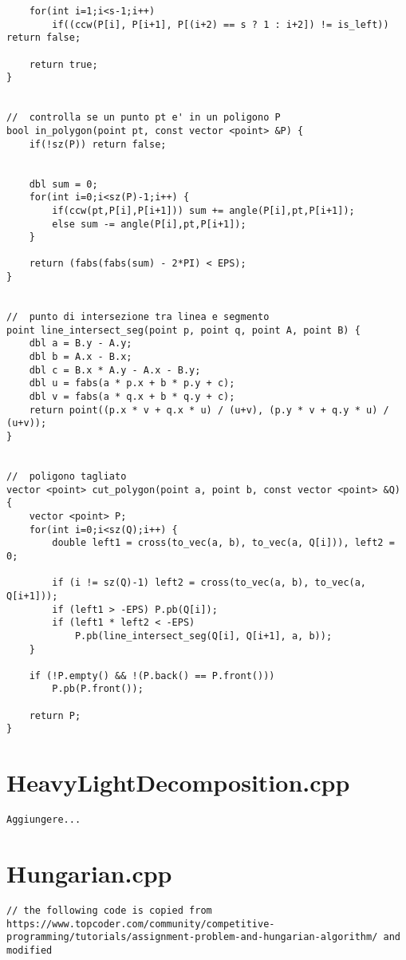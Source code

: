 \documentclass[a4paper,landscape,8pt]{extarticle}
\begin{document}
\begin{multicols}{3}
\begin{lstlisting}
    for(int i=1;i<s-1;i++)
        if((ccw(P[i], P[i+1], P[(i+2) == s ? 1 : i+2]) != is_left)) return false;

    return true;
}


//  controlla se un punto pt e' in un poligono P
bool in_polygon(point pt, const vector <point> &P) {
    if(!sz(P)) return false;


    dbl sum = 0;
    for(int i=0;i<sz(P)-1;i++) {
        if(ccw(pt,P[i],P[i+1])) sum += angle(P[i],pt,P[i+1]);
        else sum -= angle(P[i],pt,P[i+1]);
    }

    return (fabs(fabs(sum) - 2*PI) < EPS);
}


//  punto di intersezione tra linea e segmento
point line_intersect_seg(point p, point q, point A, point B) {
    dbl a = B.y - A.y;
    dbl b = A.x - B.x;
    dbl c = B.x * A.y - A.x - B.y;
    dbl u = fabs(a * p.x + b * p.y + c);
    dbl v = fabs(a * q.x + b * q.y + c);
    return point((p.x * v + q.x * u) / (u+v), (p.y * v + q.y * u) / (u+v));
}


//  poligono tagliato
vector <point> cut_polygon(point a, point b, const vector <point> &Q) {
    vector <point> P;
    for(int i=0;i<sz(Q);i++) {
        double left1 = cross(to_vec(a, b), to_vec(a, Q[i])), left2 = 0;

        if (i != sz(Q)-1) left2 = cross(to_vec(a, b), to_vec(a, Q[i+1]));
        if (left1 > -EPS) P.pb(Q[i]);
        if (left1 * left2 < -EPS)
            P.pb(line_intersect_seg(Q[i], Q[i+1], a, b));
    }

    if (!P.empty() && !(P.back() == P.front()))
        P.pb(P.front());

    return P;
}
\end{lstlisting}

\section*{HeavyLightDecomposition.cpp}

\begin{lstlisting}
Aggiungere...
\end{lstlisting}

\section*{Hungarian.cpp}

\begin{lstlisting}
// the following code is copied from https://www.topcoder.com/community/competitive-programming/tutorials/assignment-problem-and-hungarian-algorithm/ and modified


\end{lstlisting}
\end{multicols}
\end{document}
